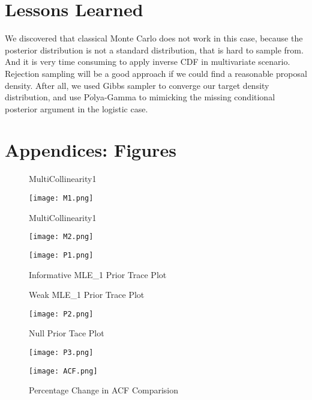 \documentclass[paper=letterpaper,fontsize=12pt,twoside,american]{scrartcl}
\begin{document}
\section{Lessons Learned}
We discovered that classical Monte Carlo does not work in this case, because the posterior distribution is not a standard distribution, that is hard to sample from. And it is very time consuming to apply inverse CDF in multivariate scenario. Rejection sampling will be a good approach if we could find a reasonable proposal density. After all, we used Gibbs sampler to converge our target density distribution, and use P$\acute{o}$lya-Gamma to mimicking the missing conditional posterior argument in the logistic case.


\newpage
\section{Appendices: Figures}
\begin{figure}[h!]
	\centering	
	\caption{MultiCollinearity1}		
	\texttt{[image: M1.png]}
	
	\caption{MultiCollinearity1}	
	\texttt{[image: M2.png]}
	
	\caption{Informative MLE\_1 Prior Trace Plot}
	\texttt{[image: P1.png]}
	
	
\end{figure}

\begin{figure}
	\centering	
	\caption{Weak MLE\_1 Prior Trace Plot}			
	\texttt{[image: P2.png]}
	\newline
	\caption{Null Prior Tace Plot}	
	\texttt{[image: P3.png]}
	\newline
	\caption{Percentage Change in ACF Comparision}	
	\texttt{[image: ACF.png]}
	
\end{figure}
\end{document}
